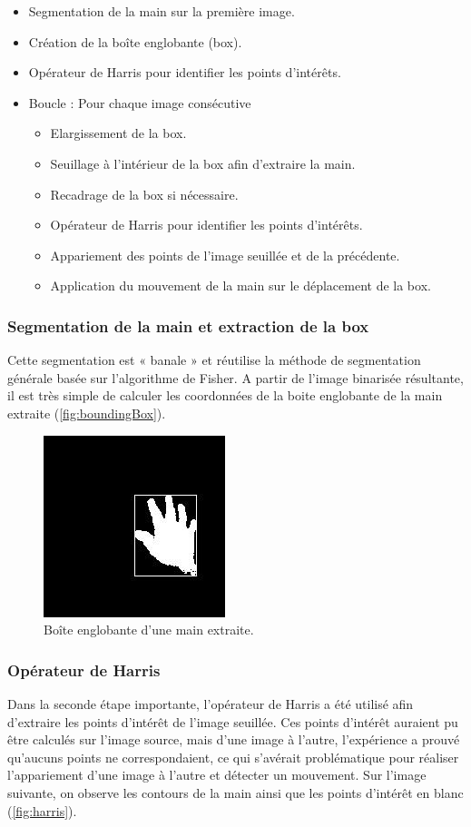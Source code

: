 \begin{itemize}
\item Segmentation de la main sur la première image.
\item Création de la boîte englobante (box).
\item Opérateur de Harris pour identifier les points d’intérêts.
\item Boucle : Pour chaque image consécutive
\begin{itemize}
\item Elargissement de la box.
\item Seuillage à l’intérieur de la box afin d’extraire la main.
\item Recadrage de la box si nécessaire.
\item Opérateur de Harris pour identifier les points d’intérêts.
\item Appariement des points de l’image seuillée et de la précédente.
\item Application du mouvement de la main sur le déplacement de la box.
\end{itemize}
\end{itemize}

\subsubsection{Segmentation de la main et extraction de la box}
Cette segmentation est « banale » et réutilise la méthode de segmentation générale basée sur l’algorithme de Fisher. A partir de l’image binarisée résultante, il est très simple de calculer les coordonnées de la boite englobante de la main extraite (\autoref{fig:boundingBox}).

\begin{figure}[htb!]
\centerline{\includegraphics{boundingBox.jpg}}
\caption{Boîte englobante d'une main extraite.}
\label{fig:boundingBox}
\end{figure}

\subsubsection{Opérateur de Harris}
Dans la seconde étape importante, l’opérateur de Harris a été utilisé afin d’extraire les points d’intérêt de l’image seuillée. Ces points d’intérêt auraient pu être calculés sur l’image source, mais d’une image à l’autre, l’expérience a prouvé qu’aucuns points ne correspondaient, ce qui s'avérait problématique pour réaliser l’appariement d’une image à l’autre et détecter un mouvement. Sur l’image suivante, on observe les contours de la main ainsi que les points d’intérêt en blanc (\autoref{fig:harris}).

